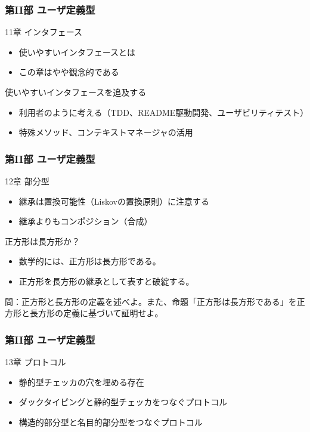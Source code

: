 \documentclass[aspectratio=169,dvipdfmx,12pt,notheorems]{beamer}
\theoremstyle{definition}
\begin{document}
\begin{frame}\frametitle{第II部 ユーザ定義型}

\begin{block}{11章 インタフェース}
\begin{itemize}
\item 使いやすいインタフェースとは
\item この章はやや観念的である
\end{itemize}
\end{block}

\begin{exampleblock}{使いやすいインタフェースを追及する}
\begin{itemize}
\item 利用者のように考える（TDD、README駆動開発、ユーザビリティテスト）
\item 特殊メソッド、コンテキストマネージャの活用
\end{itemize}
\end{exampleblock}

\end{frame}

\begin{frame}\frametitle{第II部 ユーザ定義型}

\begin{block}{12章 部分型}
\begin{itemize}
\item 継承は置換可能性（Liskovの置換原則）に注意する
\item 継承よりもコンポジション（合成）
\end{itemize}
\end{block}

\begin{alertblock}{正方形は長方形か？}
\begin{itemize}
\item 数学的には、正方形は長方形である。
\item 正方形を長方形の継承として表すと破綻する。
\end{itemize}
\end{alertblock}
問：正方形と長方形の定義を述べよ。また、命題「正方形は長方形である」を正方形と長方形の定義に基づいて証明せよ。
\end{frame}

\begin{frame}\frametitle{第II部 ユーザ定義型}

\begin{block}{13章 プロトコル}
\begin{itemize}
\item 静的型チェッカの穴を埋める存在
\item ダックタイピングと静的型チェッカをつなぐプロトコル
\item 構造的部分型と名目的部分型をつなぐプロトコル
\end{itemize}
\end{block}

\end{frame}
\end{document}
